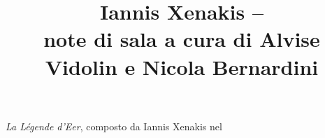\documentclass{scrartcl}
\title{Iannis Xenakis -- \LDE\\{\small note di sala a cura di Alvise Vidolin e Nicola Bernardini}}
\newcommand{\LDE}{\emph{La L\'egende d'Eer}\xspace}
\begin{document}
\LDE, composto da Iannis Xenakis nel 
\end{document}
